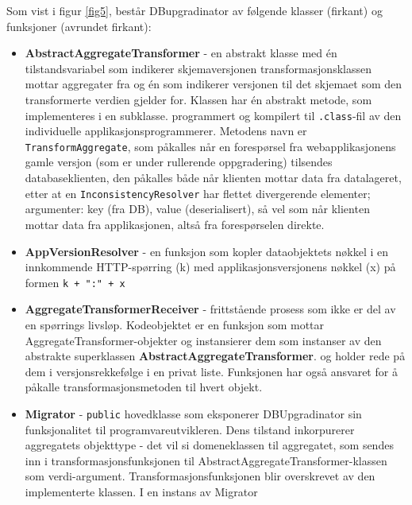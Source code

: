 Som vist i figur \ref{fig5}, består DBupgradinator av følgende klasser (firkant) og funksjoner (avrundet firkant):
\begin{itemize}
  \item \textbf{AbstractAggregateTransformer} - en abstrakt klasse med én tilstandsvariabel som indikerer skjemaversjonen transformasjonsklassen mottar aggregater fra og én som indikerer versjonen til det skjemaet som den transformerte verdien gjelder for. Klassen har én abstrakt metode, som implementeres i en subklasse.  programmert og kompilert til \texttt{.class}-fil av den individuelle applikasjonsprogrammerer. Metodens navn er \texttt{TransformAggregate}, som påkalles når en forespørsel fra webapplikasjonens gamle versjon (som er under rullerende oppgradering) tilsendes databaseklienten, den påkalles både når klienten mottar data fra datalageret, etter at en \texttt{InconsistencyResolver} har flettet divergerende elementer; argumenter: key (fra DB), value (deserialisert), så vel som når klienten mottar data fra applikasjonen, altså fra forespørselen direkte.
  \item \textbf{AppVersionResolver} - en funksjon som kopler dataobjektets nøkkel i en innkommende HTTP-spørring (k) med applikasjonsversjonens nøkkel (x) på formen \texttt{k + ":" + x}
  \item \textbf{AggregateTransformerReceiver} - frittstående prosess som ikke er del av en spørrings livsløp. Kodeobjektet er en funksjon som mottar AggregateTransformer-objekter og instansierer dem som instanser av den abstrakte superklassen \textbf{AbstractAggregateTransformer}. og holder rede på dem i versjonsrekkefølge i en privat liste. Funksjonen har også ansvaret for å påkalle transformasjonsmetoden til hvert objekt.
  \item \textbf{Migrator} - \texttt{public} hovedklasse som eksponerer DBUpgradinator sin funksjonalitet til programvareutvikleren. Dens tilstand inkorpurerer aggregatets objekttype - det vil si domeneklassen til aggregatet, som sendes inn i transformasjonsfunksjonen til AbstractAggregateTransformer-klassen som verdi-argument. Transformasjonsfunksjonen blir overskrevet av den implementerte klassen. I en instans av Migrator
\end{itemize}

\newpage

